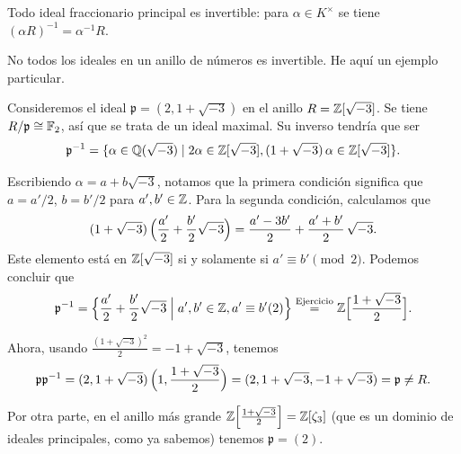 \begin{ejemplo}
  Todo ideal fraccionario principal es invertible: para $\alpha \in K^\times$ se
  tiene $(\alpha R)^{-1} = \alpha^{-1} R$.
\end{ejemplo}

No todos los ideales en un anillo de números es invertible. He aquí un ejemplo
particular.

\begin{ejemplo}
  \label{ejemplo:Z-sqrt-m3-ideal-no-invertible}
  Consideremos el ideal $\mathfrak{p} = (2, 1+\sqrt{-3})$ en el anillo
  $R = \mathbb{Z} [\sqrt{-3}]$. Se tiene $R/\mathfrak{p} \cong \mathbb{F}_2$, así que
  se trata de un ideal maximal. Su inverso tendría que ser
  \[ \mathfrak{p}^{-1} = \{ \alpha \in \mathbb{Q} (\sqrt{-3}) \mid
                           2 \alpha \in \mathbb{Z} [\sqrt{-3}],
                           (1+\sqrt{-3})\,\alpha \in \mathbb{Z} [\sqrt{-3}] \}. \]

  Escribiendo $\alpha = a+b\sqrt{-3}$, notamos que la primera condición
  significa que $a = a'/2$, $b = b'/2$ para $a', b' \in \mathbb{Z}$.
  Para la segunda condición, calculamos que
  \[ (1 + \sqrt{-3}) \, \Bigl(\frac{a'}{2} + \frac{b'}{2}\sqrt{-3}\Bigr) =
     \frac{a' - 3b'}{2} + \frac{a' + b'}{2}\,\sqrt{-3}. \]
  Este elemento está en $\mathbb{Z} [\sqrt{-3}]$ si y solamente si
  $a' \equiv b' \pmod{2}$. Podemos concluir que
  \[ \mathfrak{p}^{-1} =
     \Bigl\{ \frac{a'}{2} + \frac{b'}{2}\sqrt{-3} \Bigm|
             a',b' \in \mathbb{Z}, a' \equiv b' (2) \Bigr\}
     \stackrel{\text{Ejercicio}}{=} \mathbb{Z} \Bigl[\frac{1+\sqrt{-3}}{2}\Bigr]. \]

  Ahora, usando $\frac{(1 + \sqrt{-3})^2}{2} = -1 + \sqrt{-3}$, tenemos
  $$\mathfrak{p} \mathfrak{p}^{-1} =
    (2, 1 + \sqrt{-3}) \, \Bigl(1, \frac{1 + \sqrt{-3}}{2}\Bigr) =
    (2, 1 + \sqrt{-3}, -1 + \sqrt{-3}) = \mathfrak{p} \ne R.$$

  Por otra parte, en el anillo más grande
  $\mathbb{Z} \Bigl[\frac{1+\sqrt{-3}}{2}\Bigr] = \mathbb{Z} [\zeta_3]$
  (que es un dominio de ideales principales, como ya sabemos) tenemos
  $\mathfrak{p} = (2)$.
\end{ejemplo}

